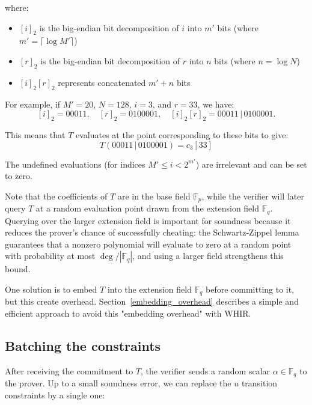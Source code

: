 \documentclass{article}
\newcommand{\Fp}{\mathbb F_p}
\newcommand{\Fq}{\mathbb F_q}
\newcommand{\Pol}{T}
\begin{document}
where:
\begin{itemize}
    \item $[i]_2$ is the big-endian bit decomposition of $i$ into $m'$ bits (where $m' = \lceil \log M' \rceil$)
    \item $[r]_2$ is the big-endian bit decomposition of $r$ into $n$ bits (where $n = \log N$)
    \item $[i]_2 [r]_2$ represents concatenated $m' + n$ bits
\end{itemize}

For example, if $M' = 20$, $N = 128$, $i = 3$, and $r = 33$, we have:
$$
[i]_2 = 00011, \quad [r]_2 = 0100001, \quad [i]_2 [r]_2 = 00011 \, | \, 0100001.
$$

This means that $\Pol$ evaluates at the point corresponding to these bits to give:
$$
\Pol(00011 \, | \, 0100001) = c_3[33]
$$


The undefined evaluations (for indices $M' \leq i < 2^{m'}$) are irrelevant and can be set to zero.


Note that the coefficients of $\Pol$ are in the base field $\Fp$, while the verifier will later query $\Pol$ at a random evaluation point drawn from the extension field $\Fq$. Querying over the larger extension field is important for soundness because it reduces the prover's chance of successfully cheating: the Schwartz-Zippel lemma guarantees that a nonzero polynomial will evaluate to zero at a random point with probability at most $\deg / |\Fq|$, and using a larger field strengthens this bound.

One solution is to embed $\Pol$ into the extension field $\Fq$ before committing to it, but this create overhead.
Section~\ref{embedding_overhead} describes a simple and efficient approach to avoid this "embedding overhead" with WHIR.

\subsection{Batching the constraints}

After receiving the commitment to $\Pol$, the verifier sends a random scalar $\alpha \in \Fq$ to the prover. Up to a small soundness error, we can replace the $u$ transition constraints by a single one: 
\end{document}
